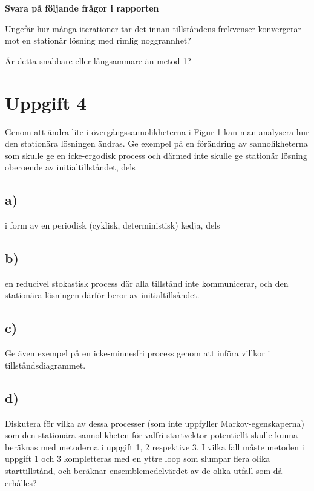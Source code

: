 \documentclass[a4paper]{article}
\begin{document}
\textbf{Svara på följande frågor i rapporten}

Ungefär hur många iterationer tar det innan
tillståndens frekvenser konvergerar mot en stationär lösning med rimlig noggrannhet?

Är detta snabbare eller långsammare än metod 1?


\section{Uppgift 4}
Genom att ändra lite i övergångssannolikheterna i Figur 1 kan man analysera hur den
stationära lösningen ändras. Ge exempel på en förändring av sannolikheterna som skulle ge
en icke-ergodisk process och därmed inte skulle ge stationär lösning oberoende av
initialtillståndet, dels

\subsection{a)}
i form av en periodisk (cyklisk, deterministisk) kedja, dels

\subsection{b)}
en reducivel stokastisk process där alla tillstånd inte kommunicerar, och den stationära
lösningen därför beror av initialtillsåndet.

\subsection{c)}
Ge även exempel på en icke-minnesfri process genom att införa villkor i tillståndsdiagrammet.

\subsection{d)}
Diskutera för vilka av dessa processer (som inte uppfyller Markov-egenskaperna) som den
stationära sannolikheten för valfri startvektor potentiellt skulle kunna beräknas med
metoderna i uppgift 1, 2 respektive 3. I vilka fall måste metoden i uppgift 1 och 3 kompletteras
med en yttre loop som slumpar flera olika starttillstånd, och beräknar ensemblemedelvärdet
av de olika utfall som då erhålles?
\end{document}
